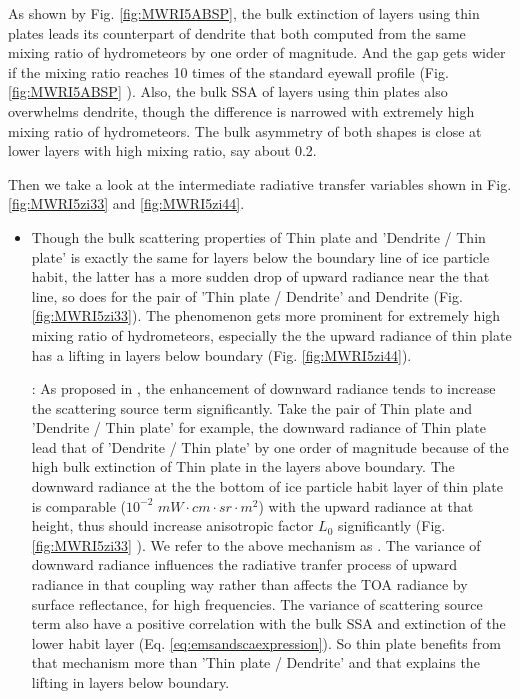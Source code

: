 As shown by Fig. \ref{fig:MWRI5ABSP}, the bulk extinction of layers using thin plates leads its counterpart of dendrite
that both computed from the same mixing ratio of hydrometeors by one order of magnitude. And the gap gets wider if the mixing ratio
reaches 10 times of the standard eyewall profile (Fig. \ref{fig:MWRI5ABSP} ). Also, the bulk SSA of
layers using thin plates also overwhelms dendrite, though the difference is narrowed with extremely high mixing ratio of hydrometeors. 
The bulk asymmetry of both shapes is close at lower layers with high mixing ratio, say about 0.2.

Then we take a look at the intermediate radiative transfer variables shown in Fig. \ref{fig:MWRI5zi33} and \ref{fig:MWRI5zi44}.

\begin{itemize}
    \item {}
    Though the bulk scattering properties of Thin plate and 'Dendrite / Thin plate' is exactly the same for layers below the
boundary line of ice particle habit, the latter has a more sudden drop of upward radiance near the that line, so does for the pair
of 'Thin plate / Dendrite' and Dendrite (Fig. \ref{fig:MWRI5zi33}). The phenomenon gets more prominent for extremely high mixing ratio
of hydrometeors, especially the the upward radiance of thin plate has a lifting in layers below boundary (Fig. \ref{fig:MWRI5zi44}).

    : As proposed in , the enhancement of downward radiance tends to increase the scattering source term 
significantly. Take the pair of Thin plate and 'Dendrite / Thin plate' for example, the downward radiance of Thin plate lead
that of 'Dendrite / Thin plate' by one order of magnitude because of the high bulk extinction of Thin plate in the layers above boundary.
The downward radiance at the the bottom of ice particle habit layer of thin plate is comparable ($10^{-2}$ $mW \cdot cm \cdot sr \cdot m^{2}$) 
with the upward radiance at that height, thus should increase anisotropic factor $L_{0}$ significantly (Fig. \ref{fig:MWRI5zi33} ).
We refer to the above mechanism as .
The variance of downward radiance influences the radiative tranfer process of upward radiance in that coupling way 
rather than affects the TOA radiance by surface reflectance, for high frequencies.
The variance of scattering source term also have a positive correlation with the bulk SSA and extinction of the lower habit layer
(Eq. \ref{eq:emsandscaexpression}). So thin plate benefits from that mechanism more than 'Thin plate / Dendrite' and that explains the lifting
in layers below boundary.


\end{itemize}
